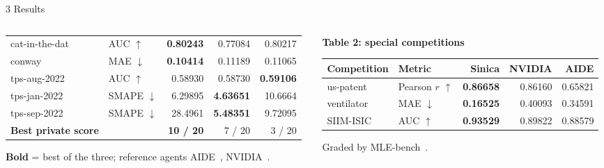 \documentclass[aspectratio=169,10pt,t]{beamer}
\newcommand{\kb}[1]{\textbf{#1}}
\begin{document}
\begin{frame}{3 Results}
\begin{columns}[t,onlytextwidth]
\begin{column}{0.54\textwidth}
{\begin{tabular}{@{}llrrr@{}}
     cat-in-the-dat & AUC $\uparrow$ & \textbf{0.80243} & 0.77084 & 0.80217\\
     conway & MAE $\downarrow$ & \textbf{0.10414} & 0.11189 & 0.11065\\
     tps-aug-2022 & AUC $\uparrow$ & 0.58930 & 0.58730 & \textbf{0.59106}\\
     tps-jan-2022 & SMAPE $\downarrow$ & 6.29895 & \textbf{4.63651} & 10.6664\\
     tps-sep-2022 & SMAPE $\downarrow$ & 28.4961 & \textbf{5.48351} & 9.72095\\
     \midrule
     \textbf{Best private score} & & \textbf{10 / 20} & 7 / 20 & 3 / 20\\
     \bottomrule
     \end{tabular}\par}
    \vspace{1mm}
    {\scriptsize\color{mut}\textbf{Bold} = best of the three; reference
     agents AIDE~\cite{aide2025}, NVIDIA~\cite{nvidia2026}.\par}
  \end{column}
  \begin{column}{0.44\textwidth}
    {\footnotesize\kb{Table 2: special competitions}\par}
    \vspace{1.2mm}
    {\fontsize{6}{7.2}\selectfont
     \setlength{\tabcolsep}{0.9mm}%
     \renewcommand{\arraystretch}{1.25}%
     \begin{tabular}{@{}llrrr@{}}
     \toprule
     \textbf{Competition} & \textbf{Metric} & \textbf{Sinica} & \textbf{NVIDIA}
       & \textbf{AIDE}\\
     \midrule
     us-patent & Pearson $r$ $\uparrow$ & \textbf{0.86658} & 0.86160
       & 0.65821\\
     ventilator & MAE $\downarrow$ & \textbf{0.16525} & 0.40093
       & 0.34591\\
     SIIM-ISIC & AUC $\uparrow$ & \textbf{0.93529} & 0.89822
       & 0.88579\\
     \bottomrule
     \end{tabular}\par}
    \vspace{1.5mm}
    {\scriptsize\color{mut}Graded by MLE-bench~\cite{mlebench}.\par}
  \end{column}
  \end{columns}

\end{frame}
\end{document}
